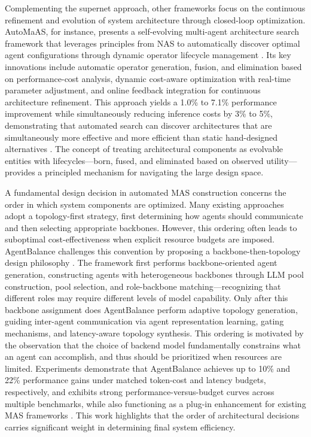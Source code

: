 \documentclass[11pt]{article}
\begin{document}
Complementing the supernet approach, other frameworks focus on the continuous refinement and evolution of system architecture through closed-loop optimization. AutoMaAS, for instance, presents a self-evolving multi-agent architecture search framework that leverages principles from NAS to automatically discover optimal agent configurations through dynamic operator lifecycle management \cite{ref270}. Its key innovations include automatic operator generation, fusion, and elimination based on performance-cost analysis, dynamic cost-aware optimization with real-time parameter adjustment, and online feedback integration for continuous architecture refinement. This approach yields a 1.0\% to 7.1\% performance improvement while simultaneously reducing inference costs by 3\% to 5\%, demonstrating that automated search can discover architectures that are simultaneously more effective and more efficient than static hand-designed alternatives \cite{ref270}. The concept of treating architectural components as evolvable entities with lifecycles---born, fused, and eliminated based on observed utility---provides a principled mechanism for navigating the large design space.

A fundamental design decision in automated MAS construction concerns the order in which system components are optimized. Many existing approaches adopt a topology-first strategy, first determining how agents should communicate and then selecting appropriate backbones. However, this ordering often leads to suboptimal cost-effectiveness when explicit resource budgets are imposed. AgentBalance challenges this convention by proposing a backbone-then-topology design philosophy \cite{ref103}. The framework first performs backbone-oriented agent generation, constructing agents with heterogeneous backbones through LLM pool construction, pool selection, and role-backbone matching---recognizing that different roles may require different levels of model capability. Only after this backbone assignment does AgentBalance perform adaptive topology generation, guiding inter-agent communication via agent representation learning, gating mechanisms, and latency-aware topology synthesis. This ordering is motivated by the observation that the choice of backend model fundamentally constrains what an agent can accomplish, and thus should be prioritized when resources are limited. Experiments demonstrate that AgentBalance achieves up to 10\% and 22\% performance gains under matched token-cost and latency budgets, respectively, and exhibits strong performance-versus-budget curves across multiple benchmarks, while also functioning as a plug-in enhancement for existing MAS frameworks \cite{ref103}. This work highlights that the order of architectural decisions carries significant weight in determining final system efficiency.
\end{document}
